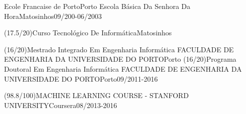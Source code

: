 

\begin{cventries}
  \cventry
{}{Ecole Francaise de Porto}{Porto}{}
{}  \cventry
{}{Escola Básica Da Senhora Da Hora}{Matosinhos}{09/200-06/2003}
{}\end{cventries}

\begin{cventries}
  \cventry
{(17.5/20)}{Curso Tecnológico De Informática}{Matosinhos}{}
{}\end{cventries}

\begin{cventries}
  \cventry
{(16/20)}{Mestrado Integrado Em Engenharia Informática FACULDADE DE ENGENHARIA DA UNIVERSIDADE DO PORTO}{Porto}{}
{}  \cventry
{\favicon(16/20)}{Programa Doutoral Em Engenharia Informática FACULDADE DE ENGENHARIA DA UNIVERSIDADE DO PORTO}{Porto}{09/2011-2016}
{}\end{cventries}

\begin{cventries}
  \cventry
{(98.8/100)}{MACHINE LEARNING COURSE - STANFORD UNIVERSITY}{Coursera}{08/2013-2016}
{}\end{cventries}
